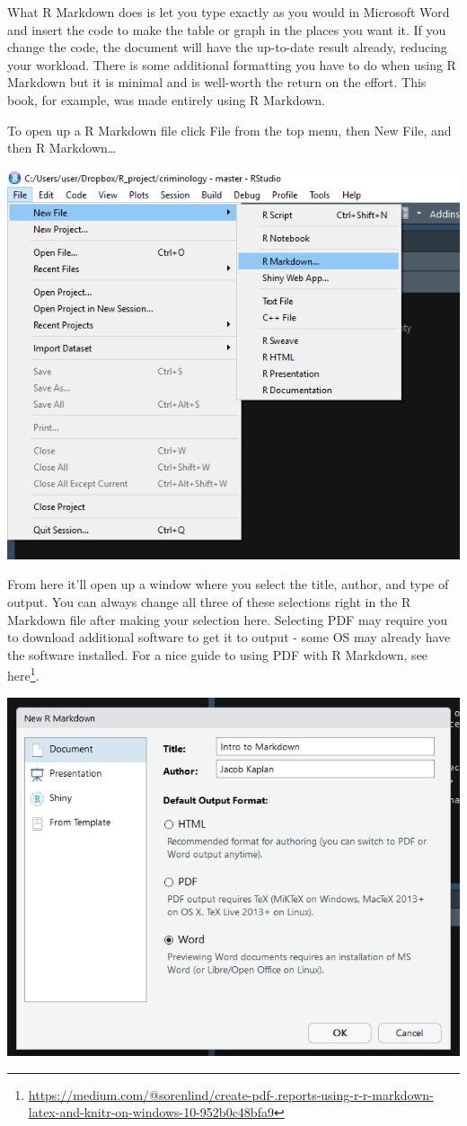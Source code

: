 \documentclass[
]{krantz}
\renewcommand{\href}[2]{#2\footnote{\url{#1}}}
\begin{document}
What R Markdown does is let you type exactly as you would in Microsoft Word and insert the code to make the table or graph in the places you want it. If you change the code, the document will have the up-to-date result already, reducing your workload. There is some additional formatting you have to do when using R Markdown but it is minimal and is well-worth the return on the effort. This book, for example, was made entirely using R Markdown.

To open up a R Markdown file click File from the top menu, then New File, and then R Markdown\ldots{}

\includegraphics{images/markdown1.png}

From here it'll open up a window where you select the title, author, and type of output. You can always change all three of these selections right in the R Markdown file after making your selection here. Selecting PDF may require you to download additional software to get it to output - some OS may already have the software installed. For a nice guide to using PDF with R Markdown, see \href{https://medium.com/@sorenlind/create-pdf-.reports-using-r-r-markdown-latex-and-knitr-on-windows-10-952b0c48bfa9}{here}.

\includegraphics{images/markdown2.png}
\end{document}
